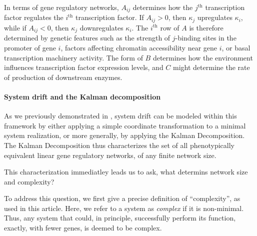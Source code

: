 \documentclass{article}
\newcommand{\1}{\mathbbm{1}}
\begin{document}
In terms of gene regulatory networks, $A_{ij}$ determines how the $j^\text{th}$ transcription factor regulates the $i^\text{th}$ transcription factor.
If $A_{ij} > 0$, then $\kappa_j$ upregulates $\kappa_i$, while if $A_{ij} < 0$, then $\kappa_j$ downregulates $\kappa_i$.
The $i^\text{th}$ row of $A$ is therefore determined by genetic features such as
the strength of $j$-binding sites in the promoter of gene $i$,
factors affecting chromatin accessibility near gene $i$,
or basal transcription machinery activity.
The form of $B$ determines how the environment influences transcription factor expression levels,
and $C$ might determine the rate of production of downstream enzymes.

\paragraph{System drift and the Kalman decomposition}

As we previously demonstrated in \citet{schiffman2018system}, system drift can be modeled within this framework
by either applying a simple coordinate transformation to a minimal system realization, or more generally,
by applying the Kalman Decomposition. The Kalman Decomposition thus characterizes the set of all phenotypically
equivalent linear gene regulatory networks, of any finite network size.

This characterization immediatley leads us to ask, what determins network size and complexity?

To address this question, we first give a precise definition of ``complexity'', as used in this article. 
Here, we refer to a system as \emph{complex} if it is non-minimal. Thus, any system that could, in principle, successfully
perform its function, exactly, with fewer genes, is deemed to be complex. 
\end{document}
